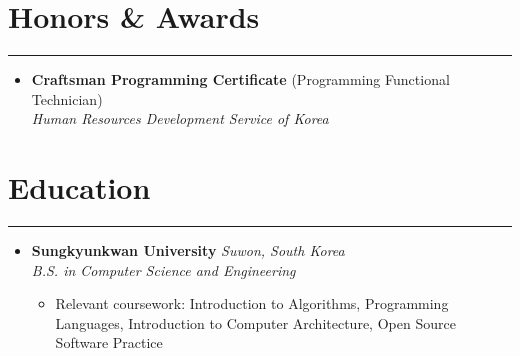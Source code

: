\documentclass[letterpaper, 10pt]{article}
\begin{document}
\section*{Honors \& Awards}
\hrule
\vspace{4pt}
\begin{itemize}
   \item[] \textbf{Craftsman Programming Certificate} (Programming Functional Technician) \\
   \textit{Human Resources Development Service of Korea}
\end{itemize}

\section*{Education}
\hrule
\vspace{4pt}
\begin{itemize}
   \item[]
       \textbf{Sungkyunkwan University} \hfill \textit{Suwon, South Korea} \\
       \textit{B.S. in Computer Science and Engineering}
       \begin{itemize}
           \item Relevant coursework: Introduction to Algorithms, Programming Languages, Introduction to Computer Architecture, Open Source Software Practice
       \end{itemize}
\end{itemize}

\end{document}
